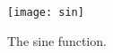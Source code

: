 \documentclass{article}
\begin{document}
\begin{figure}
\texttt{[image: sin]}
\caption{\label{sin}The sine function.}
\end{figure}
\end{document}
